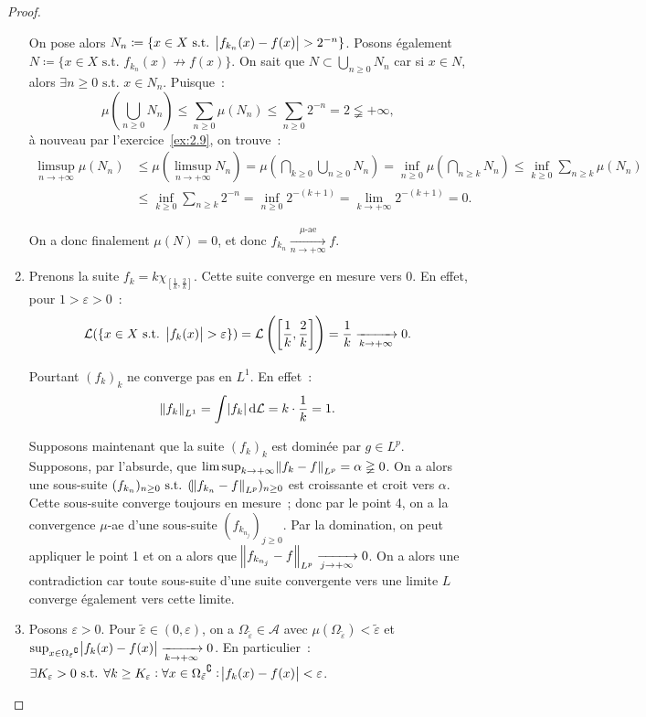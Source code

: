 \documentclass{article}
\theoremstyle{definition}
\newcommand{\pinfty}{{+\infty}}
\newcommand{\st}{\text{ s.t. }}
\newcommand{\C}{\complement}
\begin{document}
\begin{proof}
\begin{enumerate}
	On pose alors $N_n \coloneqq \{x \in X \st \abs {f_{k_n}(x)-f(x)} > 2^{-n}\}$. Posons également $N \coloneqq \{x \in X \st f_{k_n}(x) \not \to f(x)\}$. On sait
	que $N \subset \bigcup_{n \geq 0}N_n$ car si $x \in N$, alors $\exists n \geq 0 \st x \in N_n$. Puisque~:
	\[\mu\left(\bigcup_{n \geq 0}N_n\right) \leq \sum_{n \geq 0}\mu(N_n) \leq \sum_{n \geq 0}2^{-n} = 2 \lneqq \pinfty,\]
	à nouveau par l'exercice~\ref{ex:2.9}, on trouve~:
	\begin{align*}
		\limsup_{n \to \pinfty}\mu(N_n) &\leq \mu(\limsup_{n \to \pinfty}N_n) = \mu\left(\bigcap_{k \geq 0}\bigcup_{n \geq 0}N_n\right)
			= \inf_{n \geq 0}\mu\left(\bigcap_{n \geq k}N_n\right) \leq \inf_{k \geq 0}\sum_{n \geq k}\mu(N_n) \\
		&\leq \inf_{k \geq 0}\sum_{n \geq k}2^{-n} = \inf_{n \geq 0}2^{-(k+1)} = \lim_{k \to \pinfty}2^{-(k+1)} = 0.
	\end{align*}

	On a donc finalement $\mu(N) = 0$, et donc $f_{k_n} \xrightarrow[n \to \pinfty]{\mu\text{-ae}} f$.

	\item Prenons la suite $f_k = k\chi_{\left[\frac 1k, \frac 2k\right]}$. Cette suite converge en mesure vers $0$. En effet, pour $1 > \varepsilon > 0$~:
	\[\mathcal L(\{x \in X \st \abs {f_k(x)} > \varepsilon\}) = \mathcal L\left(\left[\frac 1k, \frac 2k\right]\right) = \frac 1k \xrightarrow[k \to \pinfty]{} 0.\]

	Pourtant $(f_k)_k$ ne converge pas en $L^1$. En effet~:
	\[\norm {f_k}_{L^1} = \int \abs {f_k}\dif\mathcal L = k \cdot \frac 1k = 1.\]

	Supposons maintenant que la suite $(f_k)_k$ est dominée par $g \in L^p$. Supposons, par l'absurde, que $\limsup_{k \to \pinfty}\norm {f_k-f}_{L^p} = \alpha \gneqq 0$.
	On a alors une sous-suite $(f_{k_n})_{n \geq 0} \st (\norm {f_{k_n}-f}_{L^p})_{n \geq 0}$ est croissante et croit vers $\alpha$.
	Cette sous-suite converge toujours en mesure~; donc par le point 4, on a la convergence $\mu$-ae d'une sous-suite $(f_{k_{n_j}})_{j \geq 0}$. Par la domination,
	on peut appliquer le point 1 et on a alors que $\norm {f_{k_{n_j}}-f}_{L^p} \xrightarrow[j \to \pinfty]{} 0$. On a alors une contradiction car toute sous-suite d'une
	suite convergente vers une limite $L$ converge également vers cette limite.


	\item Posons $\varepsilon > 0$. Pour $\tilde \varepsilon \in (0, \varepsilon)$, on a $\Omega_{\tilde \varepsilon} \in \mathcal A$ avec
	$\mu(\Omega_{\tilde \varepsilon}) < \tilde \varepsilon$ et $\sup_{x \in {\Omega_{\tilde \varepsilon}}^\C}\abs {f_k(x)-f(x)} \xrightarrow[k \to \pinfty]{} 0$.
	En particulier~: $\exists K_\varepsilon > 0 \st \forall k \geq K_\varepsilon : \forall x \in {\Omega_{\tilde \varepsilon}}^\C : \abs {f_k(x)-f(x)} < \varepsilon$.


\end{enumerate}
\end{proof}
\end{document}
